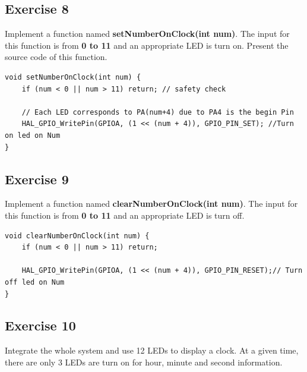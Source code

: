 \subsection{Exercise 8}
Implement a function named \textbf{setNumberOnClock(int num)}. The input for this function is from \textbf{0 to 11} and an appropriate LED is turn on. Present the source code of this function.
\begin{lstlisting}[caption=Set Number on Clock function]
void setNumberOnClock(int num) {
    if (num < 0 || num > 11) return; // safety check

    // Each LED corresponds to PA(num+4) due to PA4 is the begin Pin
    HAL_GPIO_WritePin(GPIOA, (1 << (num + 4)), GPIO_PIN_SET); //Turn on led on Num
}
\end{lstlisting}


\subsection{Exercise 9}
Implement a function named \textbf{clearNumberOnClock(int num)}. The input for this function is from \textbf{0 to 11} and an appropriate LED is turn off. 

\begin{lstlisting}[caption=Clear Number on Clock function]
void clearNumberOnClock(int num) {
    if (num < 0 || num > 11) return;

    HAL_GPIO_WritePin(GPIOA, (1 << (num + 4)), GPIO_PIN_RESET);// Turn off led on Num
}
\end{lstlisting}
\subsection{Exercise 10}
Integrate the whole system and use 12 LEDs to display a clock. At a given time, there are only 3 LEDs are turn on for hour, minute and second information.